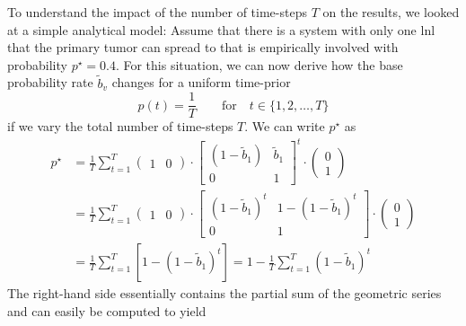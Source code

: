\documentclass[\relativeRoot/main.tex]{subfiles}
\begin{document}
To understand the impact of the number of time-steps $T$ on the results, we looked at a simple analytical model: Assume that there is a system with only one \gls{lnl} that the primary tumor can spread to that is empirically involved with probability $p^{\star} = 0.4$. For this situation, we can now derive how the base probability rate $\tilde{b}_v$ changes for a uniform time-prior
%
\begin{equation}
    p(t) = \frac{1}{T} \qquad \text{for} \quad t \in \{ 1, 2, \ldots, T \}
\end{equation}
%
if we vary the total number of time-steps $T$. We can write $p^{\star}$ as
%
\begin{equation}
    \begin{aligned}
        p^{\star} &= \frac{1}{T} \sum_{t=1}^T{
            \begin{pmatrix}
                1 & 0
            \end{pmatrix}
            \cdot
            \begin{bmatrix}
                (1 - \tilde{b}_1) & \tilde{b}_1 \\
                0 & 1
            \end{bmatrix}^t
            \cdot
            \begin{pmatrix}
                0 \\
                1
            \end{pmatrix}
        } \\
        &= \frac{1}{T} \sum_{t=1}^T{
            \begin{pmatrix}
                1 & 0
            \end{pmatrix}
            \cdot
            \begin{bmatrix}
                (1 - \tilde{b}_1)^t & 1 - (1 - \tilde{b}_1)^t \\
                0 & 1
            \end{bmatrix}
            \cdot
            \begin{pmatrix}
                0 \\
                1
            \end{pmatrix}
        } \\
        &= \frac{1}{T} \sum_{t=1}^T{ \left[ 1 - (1 - \tilde{b}_1)^t \right] }
        = 1 - \frac{1}{T} \sum_{t=1}^T{(1 - \tilde{b}_1)^t}
    \end{aligned}
\end{equation}
%
The right-hand side essentially contains the partial sum of the geometric series and can easily be computed to yield
\end{document}
